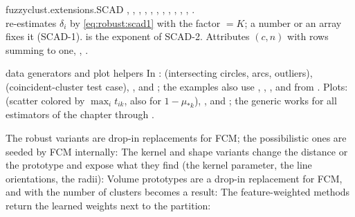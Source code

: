 \begin{apibox}{fuzzyclust.extensions.SCAD}
, , , , , , , , , , , .\\
 re-estimates $\delta_i$ by \eqref{eq:robust:scad1} with the factor $=K$; a number or an array fixes it (SCAD-1).  is the exponent of SCAD-2. Attributes  $(c,n)$ with rows summing to one, , .
\end{apibox}

\begin{apibox}{data generators and plot helpers}
In :  (intersecting circles, arcs, outliers),  (coincident-cluster test case), , and ; the examples also use , , , and  from . Plots:  (scatter colored by $\max_i t_{ik}$, also for $1-\mu_{*k}$), , and ; the generic  works for all estimators of the chapter through .
\end{apibox}

The robust variants are drop-in replacements for FCM; the possibilistic ones are seeded by FCM internally:
The kernel and shape variants change the distance or the prototype and expose what they find (the kernel parameter, the line orientations, the radii):
Volume prototypes are a drop-in replacement for FCM, and with  the number of clusters becomes a result:
The feature-weighted methods return the learned weights next to the partition:

